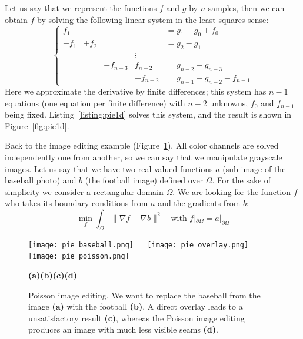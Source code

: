 \documentclass[notitlepage,oneside]{book}
\begin{document}
Let us say that we represent the functions $f$ and $g$ by $n$ samples, then we can obtain $f$ by solving the following linear system in the least squares sense:
\begin{equation}
\label{eq:pie1d}
\left \{ \begin{array}{ccccl}
f_1 &       &       &           & =  g_1 - g_0 + f_0  \\
-f_1 & + f_2 &       &           & = g_2 - g_1 \\
    &       &       & \vdots    &             \\
     &        &  -f_{n-3}     &  f_{n-2}          & = g_{n-2} - g_{n-3} \\
     &        &       & - f_{n-2} & =  g_{n-1}-g_{n-2} -f_{n-1}
\end{array} \right.
\end{equation}
Here we approximate the derivative by finite differences;
this system has $n-1$ equations (one equation per finite difference) with $n-2$ unknowns, $f_0$ and $f_{n-1}$ being fixed.
Listing~\ref{listing:pie1d} solves this system, and the result is shown in  Figure~\ref{fig:pie1d}.

Back to the image editing example (Figure~\ref{fig:pie}). All color channels are solved independently one from another, so we can say that we manipulate grayscale images.
Let us say that we have two real-valued functions $a$ (sub-image of the baseball photo) and $b$ (the football image) defined over $\Omega$.
For the sake of simplicity we consider a rectangular domain $\Omega$.
We are looking for the function $f$ who takes its boundary conditions from $a$ and the gradients from $b$:
$$
\min\limits_{f} \int_\Omega \|\nabla f - \nabla b\|^2 \quad \text{with~} f|_{\partial\Omega} = a|_{\partial\Omega}
$$

\begin{figure}[b]
    \centering
    \texttt{[image: pie\_baseball.png]}~
    ~
    \texttt{[image: pie\_overlay.png]}~
    \texttt{[image: pie\_poisson.png]}
    \\
    \begin{flushleft}
    {\hspace{.18\linewidth}\textbf{(a)\hspace{.15\linewidth}(b)\hspace{.14\linewidth}(c)\hspace{.22\linewidth}(d)}}
    \end{flushleft}
    \caption{Poisson image editing. We want to replace the baseball from the image \textbf{(a)} with the football \textbf{(b)}. A direct overlay leads to a unsatisfactory result \textbf{(c)}, whereas the Poisson image editing produces an image with much less visible seams \textbf{(d)}.}
    \label{fig:pie}
\end{figure}
\end{document}
